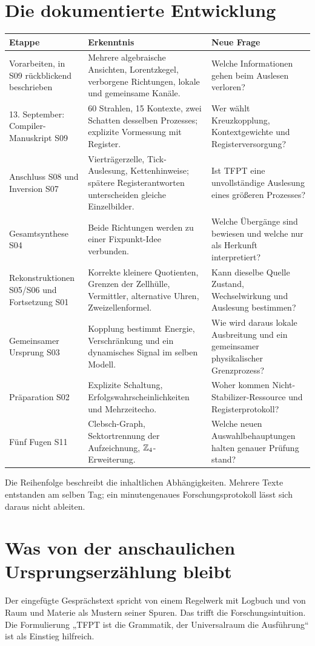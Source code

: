 \section{Die dokumentierte Entwicklung}
\begin{longtable}{L{30mm}L{55mm}L{65mm}}
\toprule
\textbf{Etappe}&\textbf{Erkenntnis}&\textbf{Neue Frage}\\\midrule\endhead
Vorarbeiten, in S09 rückblickend beschrieben&Mehrere algebraische Ansichten, Lorentzkegel, verborgene Richtungen, lokale und gemeinsame Kanäle.&Welche Informationen gehen beim Auslesen verloren?\\
13. September: Compiler-Manuskript S09&60 Strahlen, 15 Kontexte, zwei Schatten desselben Prozesses; explizite Vormessung mit Register.&Wer wählt Kreuzkopplung, Kontextgewichte und Registerversorgung?\\
Anschluss S08 und Inversion S07&Vierträgerzelle, Tick-Auslesung, Kettenhinweise; spätere Registerantworten unterscheiden gleiche Einzelbilder.&Ist TFPT eine unvollständige Auslesung eines größeren Prozesses?\\
Gesamtsynthese S04&Beide Richtungen werden zu einer Fixpunkt-Idee verbunden.&Welche Übergänge sind bewiesen und welche nur als Herkunft interpretiert?\\
Rekonstruktionen S05/S06 und Fortsetzung S01&Korrekte kleinere Quotienten, Grenzen der Zellhülle, Vermittler, alternative Uhren, Zweizellenformel.&Kann dieselbe Quelle Zustand, Wechselwirkung und Auslesung bestimmen?\\
Gemeinsamer Ursprung S03&Kopplung bestimmt Energie, Verschränkung und ein dynamisches Signal im selben Modell.&Wie wird daraus lokale Ausbreitung und ein gemeinsamer physikalischer Grenzprozess?\\
Präparation S02&Explizite Schaltung, Erfolgswahrscheinlichkeiten und Mehrzeitecho.&Woher kommen Nicht-Stabilizer-Ressource und Registerprotokoll?\\
Fünf Fugen S11&Clebsch-Graph, Sektortrennung der Aufzeichnung, $\mathbb Z_4$-Erweiterung.&Welche neuen Auswahlbehauptungen halten genauer Prüfung stand?\\\bottomrule
\end{longtable}
Die Reihenfolge beschreibt die inhaltlichen Abhängigkeiten. Mehrere Texte entstanden am selben Tag; ein minutengenaues Forschungsprotokoll lässt sich daraus nicht ableiten.

\section{Was von der anschaulichen Ursprungserzählung bleibt}
Der eingefügte Gesprächstext spricht von einem Regelwerk mit Logbuch und von Raum und Materie als Mustern seiner Spuren. Das trifft die Forschungsintuition. Die Formulierung „TFPT ist die Grammatik, der Universalraum die Ausführung“ ist als Einstieg hilfreich.

